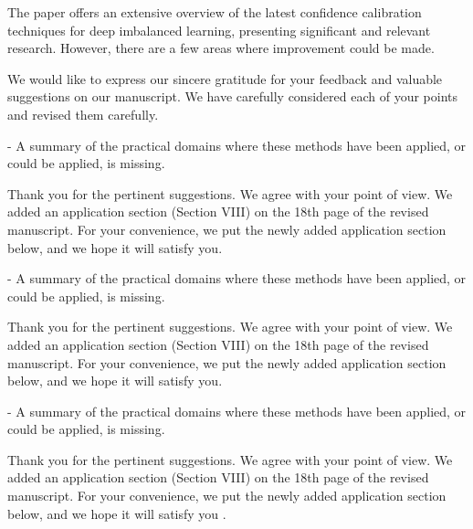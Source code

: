 
\reviewer


\begin{generalcomment}
The paper offers an extensive overview of the latest confidence calibration techniques for deep imbalanced learning, presenting significant and relevant research. However, there are a few areas where improvement could be made.
\end{generalcomment}
\begin{revmeta}[]
We would like to express our sincere gratitude for your feedback and valuable suggestions on our manuscript. We have carefully considered each of your points and revised them carefully.
\end{revmeta}

\begin{revcomment}
- A summary of the practical domains where these methods have been applied, or could be applied, is missing.
\end{revcomment}
\begin{revresponse}[]
Thank you for the pertinent suggestions. We agree with your point of view. We added an application section (Section VIII) on the 18th page of the revised manuscript. For your convenience, we put the newly added application section below, and we hope it will satisfy you.
	

	
\end{revresponse}



\begin{revcomment}
- A summary of the practical domains where these methods have been applied, or could be applied, is missing.
\end{revcomment}
\begin{revresponse}[]
Thank you for the pertinent suggestions. We agree with your point of view. We added an application section (Section VIII) on the 18th page of the revised manuscript. For your convenience, we put the newly added application section below, and we hope it will satisfy you.
	

	
\end{revresponse}



\begin{revcomment}
- A summary of the practical domains where these methods have been applied, or could be applied, is missing.
\end{revcomment}
\begin{revresponse}[]
Thank you for the pertinent suggestions. We agree with your point of view. We added an application section (Section VIII) on the 18th page of the revised manuscript. For your convenience, we put the newly added application section below, and we hope it will satisfy you \cite{wu2020comprehensive,ji2021survey,li2021survey,zhang2023survey,li2021low}.
	

	
\end{revresponse}



